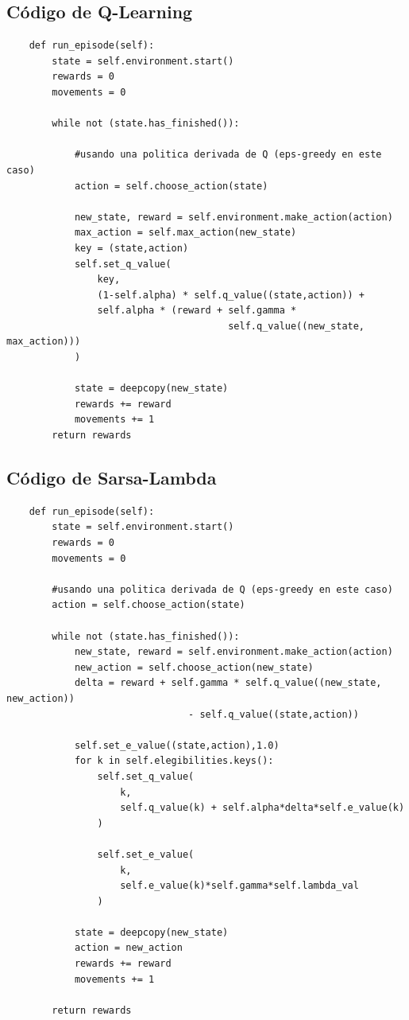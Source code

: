 \documentclass[11pt, a4paper]{article}
\begin{document}
\subsection{Código de Q-Learning}
\begin{verbatim}
    def run_episode(self):
        state = self.environment.start()
        rewards = 0
        movements = 0
        
        while not (state.has_finished()):
            
            #usando una politica derivada de Q (eps-greedy en este caso)
            action = self.choose_action(state)
            
            new_state, reward = self.environment.make_action(action)
            max_action = self.max_action(new_state)
            key = (state,action)
            self.set_q_value(
                key, 
                (1-self.alpha) * self.q_value((state,action)) + 
                self.alpha * (reward + self.gamma * 
                                       self.q_value((new_state, max_action)))
            )
            
            state = deepcopy(new_state)
            rewards += reward
            movements += 1
        return rewards
\end{verbatim}


\subsection{Código de Sarsa-Lambda}
\begin{verbatim}
    def run_episode(self):
        state = self.environment.start()
        rewards = 0
        movements = 0
        
        #usando una politica derivada de Q (eps-greedy en este caso)
        action = self.choose_action(state)
                
        while not (state.has_finished()):
            new_state, reward = self.environment.make_action(action)
            new_action = self.choose_action(new_state)
            delta = reward + self.gamma * self.q_value((new_state, new_action)) 
                                - self.q_value((state,action))
            
            self.set_e_value((state,action),1.0)
            for k in self.elegibilities.keys():
                self.set_q_value(
                    k, 
                    self.q_value(k) + self.alpha*delta*self.e_value(k)
                )
                
                self.set_e_value(
                    k, 
                    self.e_value(k)*self.gamma*self.lambda_val
                )

            state = deepcopy(new_state)
            action = new_action
            rewards += reward
            movements += 1
        
        return rewards
\end{verbatim}
\end{document}
